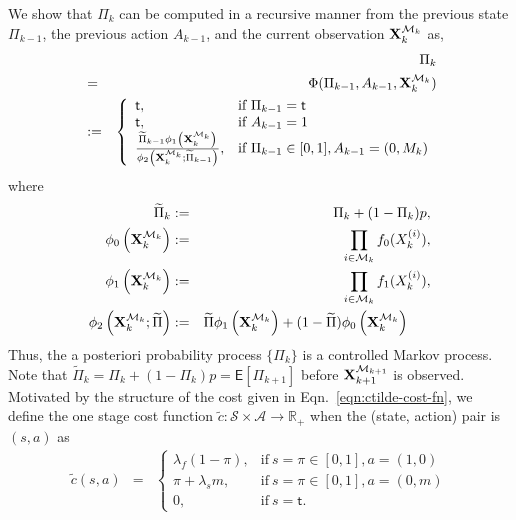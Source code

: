 \documentclass[journal]{IEEEtran}
\newcommand{\EXP}[1]{\mathsf{E}\!\left[#1\right]}
\newcommand{\nn}{\nonumber \\}
\begin{document}
We show that $\Pi_k$ can be computed in a recursive manner from the 
previous state $\Pi_{k-1}$, the previous action $A_{k-1}$, and the 
current observation ${\bf X}^{{\cal M}_k}_k$ as, 
\begin{eqnarray}
\label{eqn:recursion} 
& & \Pi_{k} \nn
&  = & {\Phi}(\Pi_{k-1},A_{k-1}, {\bf X}^{{\cal M}_k}_k)\nn 
         & := & \left\{
			 \begin{array}{ll}
             {\sf t}, & \text{if} \ \Pi_{k-1} = {\sf t}\\
             {\sf t}, & \text{if} \ A_{k-1} = 1 \\
             \frac{\widetilde{\Pi}_{k-1}\phi_1\left({\bf X}^{{\cal
			 M}_k}_k\right)
}{\phi_2\left({\bf X}^{{\cal M}_k}_k; 	\widetilde{\Pi}_{k-1}\right) }, &
\text{if} \ \Pi_{k-1} \in [0, 1],  A_{k-1} = (0,M_k) 
			 \end{array}
			 \right.
\end{eqnarray} 
where  
\begin{eqnarray}
\label{eqn:some-definitions}
\widetilde{\Pi}_k & := & \Pi_k+(1-\Pi_k)p, \nn 
\phi_0\left({\bf X}_k^{{\cal M}_k}\right)  & := & \prod_{i \in {\cal M}_k} f_0(X_k^{(i)}), \nonumber \\ 
\phi_1\left({\bf X}_k^{{\cal M}_k}\right)  & := & \prod_{i \in {\cal M}_k} f_1(X_k^{(i)}), \nonumber \\ 
\phi_2\left({\bf X}_k^{{\cal M}_k};\widetilde{\Pi}\right)  & := & \widetilde{\Pi}
\phi_1\left({\bf X}_k^{{\cal M}_k}\right) + 
(1-\widetilde{\Pi})
\phi_0\left({\bf X}_k^{{\cal M}_k}\right) \ \ \ \ \  
\end{eqnarray}
Thus, the a posteriori probability process $\{\Pi_k\}$ is a 
controlled Markov process. Note that $\widetilde{\Pi}_k = \Pi_k + (1-\Pi_k)p =  
\EXP{\Pi_{k+1}}$ before ${\bf X}_{k+1}^{{\cal M}_{k+1}}$ is observed. 
Motivated by the structure of the cost given in 
Eqn.~\ref{eqn:ctilde-cost-fn}, we define the 
one stage cost function
$\widetilde{c}:\mathcal{S}\times\mathcal{A}\to\mathbb{R}_+$ 
when the (state, action) 
pair is $(s, a)$ 
as
\begin{eqnarray*}
\widetilde{c}(s,a) 
& = & \left\{
         \begin{array}{ll}
         \lambda_f \left(1-\pi\right), & 
		 \text{if} \ s=\pi \in [0,1], a = (1,0)\\ 
         \pi + \lambda_s m ,           & \text{if} \ s=\pi \in [0,1], a = (0,m)\\
         0,                            & \text{if} \ s = \mathsf{t}.
         \end{array}
      \right.
\end{eqnarray*}
\end{document}
